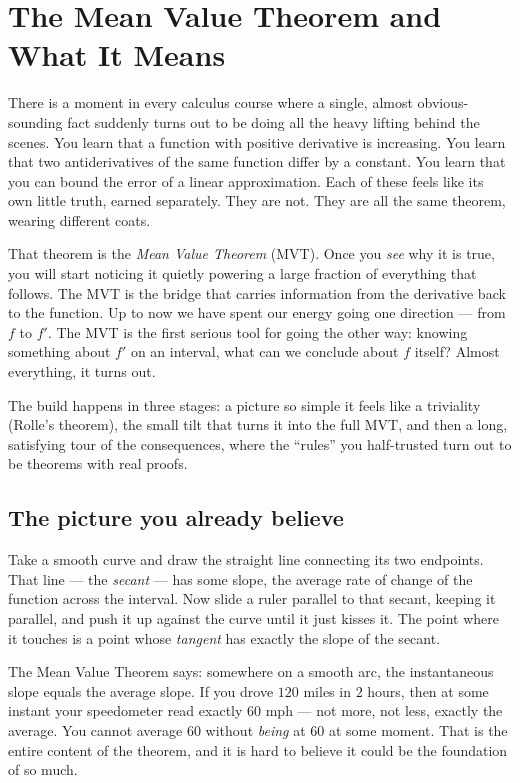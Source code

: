 \chapter{The Mean Value Theorem and What It Means}

There is a moment in every calculus course where a single, almost obvious-sounding
fact suddenly turns out to be doing all the heavy lifting behind the scenes. You
learn that a function with positive derivative is increasing. You learn that two
antiderivatives of the same function differ by a constant. You learn that you can
bound the error of a linear approximation. Each of these feels like its own little
truth, earned separately. They are not. They are all the same theorem, wearing
different coats.

That theorem is the \emph{Mean Value Theorem} (MVT). Once you \emph{see} why it is
true, you will start noticing it quietly powering a large fraction of everything
that follows. The MVT is the bridge that carries
information from the derivative back to the function. Up to now we have spent our
energy going one direction --- from $f$ to $f'$. The MVT is the first serious tool
for going the other way: knowing something about $f'$ on an interval, what can we
conclude about $f$ itself? Almost everything, it turns out.

The build happens in three stages: a picture so simple it feels like a triviality
(Rolle's theorem), the small tilt that turns it into the full MVT, and then a long,
satisfying tour of the consequences, where the ``rules'' you half-trusted turn out
to be theorems with real proofs.

\section{The picture you already believe}

Take a smooth curve and draw the straight line connecting its two endpoints. That
line --- the \emph{secant} --- has some slope, the average rate of change of the
function across the interval. Now slide a ruler parallel to that secant, keeping it
parallel, and push it up against the curve until it just kisses it. The point where
it touches is a point whose \emph{tangent} has exactly the slope of the secant.

\begin{intuitionbox}
The Mean Value Theorem says: somewhere on a smooth arc, the instantaneous slope
equals the average slope. If you drove $120$ miles in $2$ hours, then at some
instant your speedometer read exactly $60$ mph --- not more, not less, exactly the
average. You cannot average $60$ without \emph{being} at $60$ at some moment. That
is the entire content of the theorem, and it is hard to believe it could be the
foundation of so much.
\end{intuitionbox}


